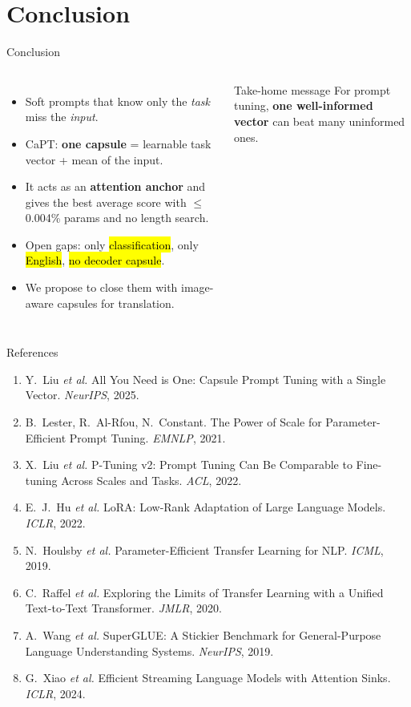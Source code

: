 \documentclass[aspectratio=169,11pt]{beamer}
\begin{document}
\section{Conclusion}

\begin{frame}{Conclusion}
\begin{columns}[c]
\begin{itemize}\setlength\itemsep{6pt}
  \item Soft prompts that know only the \emph{task} miss the \emph{input}.
  \item CaPT: \textbf{one capsule} = learnable task vector + mean of the input.
  \item It acts as an \textbf{attention anchor} and gives the best average score with $\le$0.004\% params and no length search.
  \item Open gaps: only \hl{classification}, only \hl{English}, \hl{no decoder capsule}.
  \item We propose to close them with image-aware capsules for  translation.
\end{itemize}
\begin{exampleblock}{Take-home message}
For prompt tuning, \textbf{one well-informed vector} can beat many uninformed ones.
\end{exampleblock}
\end{columns}
\end{frame}

\begin{frame}{References}
\scriptsize
\begin{enumerate}\setlength\itemsep{3pt}
  \item Y.~Liu \textit{et al.} All You Need is One: Capsule Prompt Tuning with a Single Vector. \textit{NeurIPS}, 2025.
  \item B.~Lester, R.~Al-Rfou, N.~Constant. The Power of Scale for Parameter-Efficient Prompt Tuning. \textit{EMNLP}, 2021.
  \item X.~Liu \textit{et al.} P-Tuning v2: Prompt Tuning Can Be Comparable to Fine-tuning Across Scales and Tasks. \textit{ACL}, 2022.
  \item E.~J.~Hu \textit{et al.} LoRA: Low-Rank Adaptation of Large Language Models. \textit{ICLR}, 2022.
  \item N.~Houlsby \textit{et al.} Parameter-Efficient Transfer Learning for NLP. \textit{ICML}, 2019.
  \item C.~Raffel \textit{et al.} Exploring the Limits of Transfer Learning with a Unified Text-to-Text Transformer. \textit{JMLR}, 2020.
  \item A.~Wang \textit{et al.} SuperGLUE: A Stickier Benchmark for General-Purpose Language Understanding Systems. \textit{NeurIPS}, 2019.
  \item G.~Xiao \textit{et al.} Efficient Streaming Language Models with Attention Sinks. \textit{ICLR}, 2024.
\end{enumerate}
\end{frame}
\end{document}
